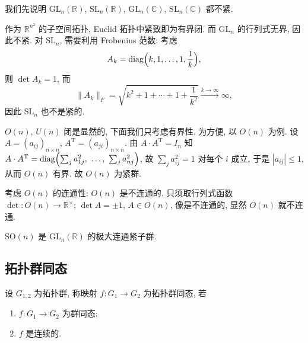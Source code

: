 我们先说明 $\mathrm{GL}_n(\mathbb{R})$, $\mathrm{SL}_n(\mathbb{R})$, $\mathrm{GL}_n(\mathbb{C})$,
$\mathrm{SL}_n(\mathbb{C})$ 都不紧.

作为 $\mathbb{R}^{n^2}$ 的子空间拓扑, Euclid 拓扑中紧致即为有界闭.
而 $\mathrm{GL}_n$ 的行列式无界, 因此不紧.
对 $\mathrm{SL}_n$, 需要利用 Frobenius 范数: 考虑
\[
  A_k=\operatorname{diag}\Bigl(k,1,\dots,1,\frac1k\Bigr),
\]
则 $\det A_k=1$, 而
\[
  \|A_k\|_F=\sqrt{k^2+1+\cdots+1+\frac{1}{k^2}}\xrightarrow{k\to\infty}\infty,
\]
因此 $\mathrm{SL}_n$ 也不是紧的.

$O(n)$, $U(n)$ 闭是显然的, 下面我们只考虑有界性. 为方便, 以 $O(n)$ 为例.
设 $A=(a_{ij})_{n\times n}$, $A^{\mathrm{T}}=(a_{ji})_{n\times n}$. 由 $A\cdot A^{\mathrm{T}}=I_n$ 知
$A\cdot A^{\mathrm{T}}=\operatorname{diag}\Bigl(\sum_{j}a_{1j}^2,\ \dots,\ \sum_{j}a_{nj}^2\Bigr)$,
故 $\sum_j a_{ij}^2=1$ 对每个 $i$ 成立, 于是 $|a_{ij}|\le1$, 从而 $O(n)$ 有界.
故 $O(n)$ 为紧群.

\begin{remark}\label{rem:orthogonal-disconnected}
考虑 $O(n)$ 的连通性: $O(n)$ 是不连通的. 只须取行列式函数
$\det\colon O(n)\to\mathbb{R}^{\times}$; $\det A=\pm1$, $A\in O(n)$, 像是不连通的,
显然 $O(n)$ 就不连通.
\end{remark}

\begin{proposition}\label{prop:SOn-maximal}
$\mathrm{SO}(n)$ 是 $\mathrm{GL}_n(\mathbb{R})$ 的极大连通紧子群.
\end{proposition}

\subsection{拓扑群同态}

\begin{definition}[拓扑群同态]\label{def:topological-hom}
设 $G_{1,2}$ 为拓扑群, 称映射 $f\colon G_1\to G_2$ 为拓扑群同态, 若
\begin{enumerate}
  \item $f\colon G_1\to G_2$ 为群同态;
  \item $f$ 是连续的.
\end{enumerate}
\end{definition}

